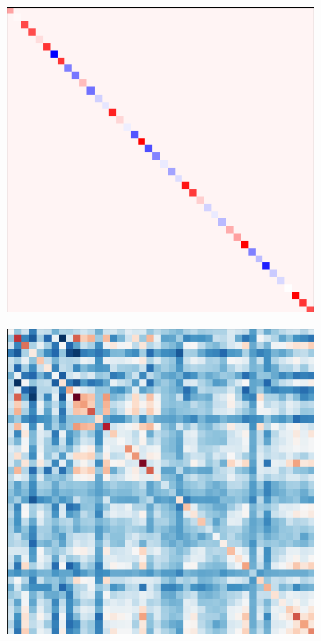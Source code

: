 	\begin{figure}[!h]
		\centering
		\begin{subfigure}[b]{0.4\textwidth}
			\centering
			\includegraphics[width=\textwidth]{figures/training-roi.png}
		\end{subfigure}
		\hspace{-1em}
		\begin{subfigure}[b]{0.4\textwidth}
			\centering
			\includegraphics[width=\textwidth]{figures/training-connectome.png}

\end{subfigure}
\end{figure}
